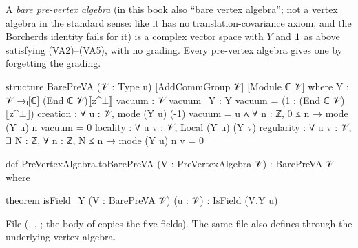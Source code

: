 \begin{definition}\label{l03:def:bare}
A \emph{bare pre-vertex algebra} (in this book also ``bare vertex algebra''; not a vertex algebra in the standard sense:
like  it has no translation-covariance axiom, and the Borcherds identity fails for it) is a
complex vector space with $Y$ and $\mathbf{1}$ as above satisfying
(VA2)--(VA5), with no grading. Every pre-vertex algebra gives one by forgetting
the grading.
\end{definition}
\begin{leancode}
structure BarePreVA (𝒱 : Type u) [AddCommGroup 𝒱] [Module ℂ 𝒱] where
  Y : 𝒱 →ₗ[ℂ] (End ℂ 𝒱)⟦z^±⟧
  vacuum : 𝒱
  vacuum_Y : Y vacuum = (1 : (End ℂ 𝒱)⟦z^±⟧)
  creation : ∀ u : 𝒱, mode (Y u) (-1) vacuum = u ∧ ∀ n : ℤ, 0 ≤ n → mode (Y u) n vacuum = 0
  locality : ∀ u v : 𝒱, Local (Y u) (Y v)
  regularity : ∀ u v : 𝒱, ∃ N : ℤ, ∀ n : ℤ, N ≤ n → mode (Y u) n v = 0

def PreVertexAlgebra.toBarePreVA (V : PreVertexAlgebra 𝒱) : BarePreVA 𝒱 where

theorem isField_Y (V : BarePreVA 𝒱) (u : 𝒱) : IsField (V.Y u)
\end{leancode}
File  (,
, ; the body of  copies
the five fields). The same file also defines  through the
underlying vertex algebra.

